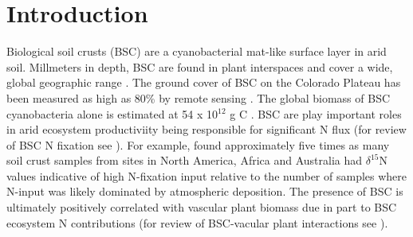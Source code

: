 \section{Introduction}


Biological soil crusts (BSC) are a cyanobacterial mat-like surface layer in arid soil. Millmeters in depth, BSC are found in plant interspaces and cover a wide, global geographic range \cite{garcia2003estimates}. The ground cover of BSC on the Colorado Plateau has been measured as high as 80\% by remote sensing \cite{karnieli2001}. The global biomass of BSC cyanobacteria alone is estimated at 54 x 10$^{12}$ g C \cite{garcia2003estimates}. BSC are play important roles in arid ecosystem productiviity being responsible for significant N flux (for review of BSC N fixation see \citet{belnap2003}). For example, \citet{Evans_1999} found approximately five times as many soil crust samples from sites in North America, Africa and Australia had $\delta^{15}$N values indicative of high N-fixation input relative to the number of samples where N-input was likely dominated by atmospheric deposition. The presence of BSC is ultimately positively correlated with vascular plant biomass due in part to BSC ecosystem N contributions (for review of BSC-vacular plant interactions see \citet{BelnapVascular}).

